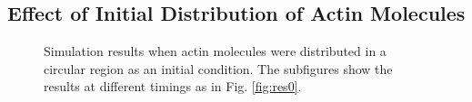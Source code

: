 \documentclass[a4paper,12pt, oneside]{book}
\begin{document}
\subsection{Effect of Initial Distribution of Actin Molecules}
\begin{figure}[tbp]
 \caption{Simulation results when actin molecules were distributed in a circular region as an initial condition. The subfigures show the results at different timings as in Fig. \ref{fig:res0}.}
 \label{fig:res6}
\end{figure}
\end{document}
